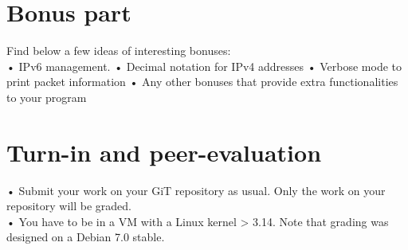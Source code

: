 \documentclass{42-en}
\begin{document}
\chapter{Bonus part}

 Find below a few ideas of interesting bonuses:\\
 
    • IPv6 management.
    • Decimal notation for IPv4 addresses
    • Verbose mode to print packet information
    • Any other bonuses that provide extra functionalities to your program


\chapter{Turn-in and peer-evaluation}

        • Submit your work on your GiT repository as usual. Only the work on your repository will be graded.\\
        \newline
        • You have to be in a VM with a Linux kernel > 3.14. Note that grading was designed on a Debian 7.0 stable.



\end{document}
